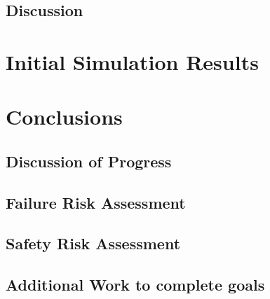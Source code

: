 \documentclass[a4paper,12pt]{report}
\begin{document}
\section{Discussion}

\chapter{Initial Simulation Results}



\chapter{Conclusions}
\section{Discussion of Progress}
\section{Failure Risk Assessment}
\section{Safety Risk Assessment}
\section{Additional Work to complete goals}
\end{document}
